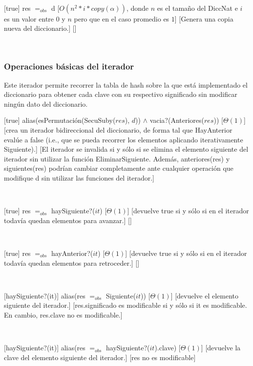 ~

[true]
{res $=_{obs}$ d}
[$O(n^2 * i * copy(\alpha))$, donde $n$ es el tamaño del DiccNat e $i$ es un valor entre $0$ y $n$ pero que en el caso promedio es $1$]
[Genera una copia nueva del diccionario.]
[]

~

\subsubsection{Operaciones básicas del iterador}

Este iterador permite recorrer la tabla de hash sobre la que est\'{a} implementado el diccionario para obtener cada clave con su respectivo significado sin modificar ning\'{u}n dato del diccionario.

[true]
{alias(esPermutación(SecuSuby($res$), $d$)) $\land$ vacia?(Anteriores($res$))}
[$\Theta(1)$]
[crea un iterador bidireccional del diccionario, de forma tal que HayAnterior evalúe a false (i.e.,
que se pueda recorrer los elementos aplicando iterativamente Siguiente).]
[El iterador se invalida si y sólo si se elimina el elemento siguiente del iterador sin utilizar la función
EliminarSiguiente. Además, anteriores(res) y siguientes(res) podrían cambiar completamente ante cualquier
operación que modifique d sin utilizar las funciones del iterador.]

~

[true]
{res $=_{obs}$ haySiguiente?($it$)}
[$\Theta(1)$]
[devuelve true si y sólo si en el iterador todavía quedan elementos para avanzar.]
[]

~

[true]
{res $=_{obs}$ hayAnterior?($it$)}
[$\Theta(1)$]
[devuelve true si y sólo si en el iterador todavía quedan elementos para retroceder.]
[]

~

[haySiguiente?(it)]
{alias(res $=_{obs}$ Siguiente($it$))}
[$\Theta(1)$]
[devuelve el elemento siguiente del iterador.]
[res.significado es modificable si y sólo si it es modificable. En cambio, res.clave no es modificable.]

~


[haySiguiente?(it)]
{alias(res $=_{obs}$ haySiguiente?($it$).clave)}
[$\Theta(1)$]
[devuelve la clave del elemento siguiente del iterador.]
[res no es modificable]

